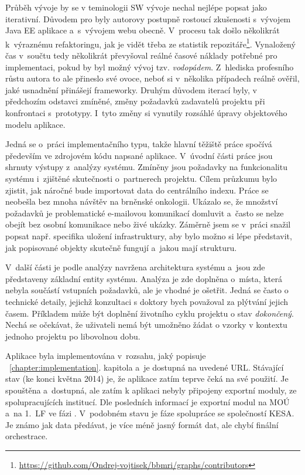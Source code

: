 \documentclass[11pt,draft,oneside]{fithesis2}
\begin{document}
Průběh vývoje by se v teminologii SW vývoje nechal nejlépe popsat jako iterativní. Důvodem pro  byly autorovy postupně rostoucí zkušenosti s~vývojem Java EE aplikace a~s~vývojem webu obecně. V~procesu tak došlo několikrát k~výraznému refaktoringu, jak je vidět třeba ze statistik repozitáře\footnote{\url{https://github.com/Ondrej-vojtisek/bbmri/graphs/contributors}}. Vynaložený čas v~součtu tedy několikrát převyšoval reálné časové náklady potřebné pro implementaci, pokud by byl možný vývoj tzv. \textit{vodopádem}. Z~hlediska profesního růstu autora to ale přineslo své ovoce, neboť si v~několika případech reálně ověřil, jaké usnadnění přinášejí frameworky. Druhým důvodem iterací byly, v předchozím odstavci zmíněné, změny požadavků zadavatelů projektu při konfrontaci s~prototypy. I~tyto změny si vynutily rozsáhlé úpravy objektového modelu aplikace. 

Jedná se o~práci implementačního typu, takže hlavní těžiště práce spočívá především ve zdrojovém kódu napsané aplikace. V~úvodní části práce jsou shrnuty výstupy z~analýzy systému. Zmíněny jsou požadavky na funkcionalitu systému i~zjištěné skutečnosti o~partnerech projektu. Cílem průzkumu bylo zjistit, jak náročné bude importovat data do centrálního indexu. 
Práce se neobešla bez mnoha návštěv na brněnské onkologii. Ukázalo se, že množství požadavků je problematické e-mailovou komunikací domluvit a~často se nelze obejít bez osobní komunikace nebo živé ukázky. Záměrně jsem se v~práci snažil popsat např. specifika uložení infrastruktury, aby bylo možno si lépe představit, jak popisované objekty skutečně fungují a~jakou mají strukturu. 

V~další části je podle analýzy navržena architektura systému a~jsou zde představeny základní entity systému. Analýza je zde doplněna o~místa, která nebyla součástí vstupních požadavků, ale je vhodné je ošetřit. Jedná se často o technické detaily, jejichž konzultaci s doktory bych považoval za plýtvání jejich časem. Příkladem může být doplnění životního cyklu projektu o stav \textit{dokončený}. Nechá se očekávat, že uživateli nemá být umožněno žádat o vzorky v kontextu jednoho projektu po libovolnou dobu.

Aplikace byla implementována v~rozsahu, jaký popisuje ~\ref{chapter:implementation}. kapitola a~je dostupná na uvedené URL. Stávající stav (ke konci května 2014) je, že aplikace zatím teprve čeká na své  použití. Je spouštěna a~dostupná, ale zatím k aplikaci nebyly připojeny exportní moduly, ze spolupracujících institucí. Dle posledních informací je exportní modul na MOÚ a~na 1.~LF ve fázi . V~podobném stavu je fáze spolupráce se společností KESA. Je známo jak data předávat, je více méně jasný formát dat, ale chybí finální orchestrace. 
\end{document}
